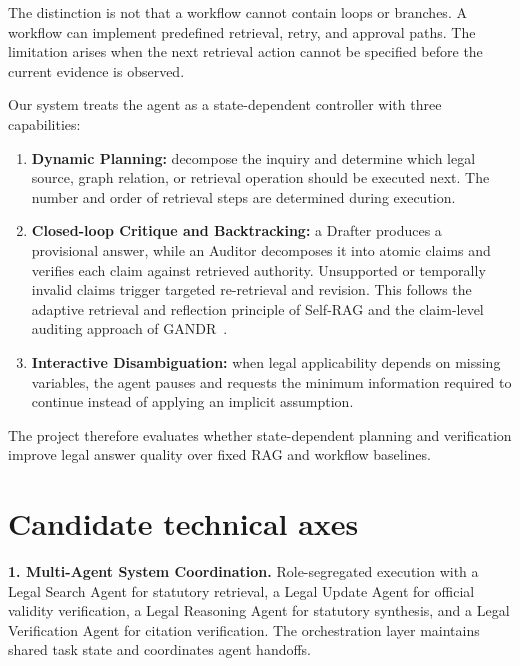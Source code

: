 \documentclass[10pt,a4paper]{article}
\begin{document}
The distinction is not that a workflow cannot contain loops or branches. A workflow can implement predefined retrieval, retry, and approval paths. The limitation arises when the next retrieval action cannot be specified before the current evidence is observed.

Our system treats the agent as a state-dependent controller with three capabilities:

\begin{enumerate}
    \item \textbf{Dynamic Planning:} decompose the inquiry and determine which legal source, graph relation, or retrieval operation should be executed next. The number and order of retrieval steps are determined during execution.

    \item \textbf{Closed-loop Critique and Backtracking:} a Drafter produces a provisional answer, while an Auditor decomposes it into atomic claims and verifies each claim against retrieved authority. Unsupported or temporally invalid claims trigger targeted re-retrieval and revision. This follows the adaptive retrieval and reflection principle of Self-RAG and the claim-level auditing approach of GANDR~\cite{asai2024selfrag,qian2026gandr}.

    \item \textbf{Interactive Disambiguation:} when legal applicability depends on missing variables, the agent pauses and requests the minimum information required to continue instead of applying an implicit assumption.
\end{enumerate}

The project therefore evaluates whether state-dependent planning and verification improve legal answer quality over fixed RAG and workflow baselines.

\section{Candidate technical axes}

\textbf{1. Multi-Agent System Coordination.}
Role-segregated execution with a Legal Search Agent for statutory retrieval, a Legal Update Agent for official validity verification, a Legal Reasoning Agent for statutory synthesis, and a Legal Verification Agent for citation verification. The orchestration layer maintains shared task state and coordinates agent handoffs.
\end{document}
